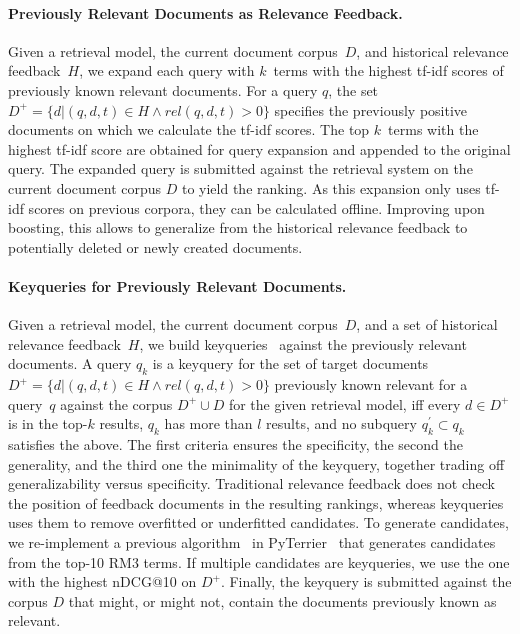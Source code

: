 \paragraph{Previously Relevant Documents as Relevance Feedback.} Given a retrieval model, the current document corpus~$D$, and historical relevance feedback~$H$, we expand each query with $k$~terms with the highest tf-idf scores of previously known relevant documents. For a query $q$, the set $D^{+} = \{d| (q,d,t) \in H \wedge rel(q,d,t) > 0\}$ specifies the previously positive documents on which we calculate the tf-idf scores. The top $k$~terms with the highest tf-idf score are obtained for query expansion and appended to the original query. The expanded query is submitted against the retrieval system on the current document corpus $D$ to yield the ranking. As this expansion only uses tf-idf scores on  previous corpora, they can be calculated offline. Improving upon boosting, this allows to generalize from the historical relevance feedback to potentially deleted or newly created documents.


\paragraph{Keyqueries for Previously Relevant Documents.} Given a retrieval model, the current document corpus~$D$, and a set of historical relevance feedback~$H$, we build keyqueries~\cite{froebe:2021c,gollub:2013a,hagen:2016b} against the previously relevant documents. A query $q_{k}$ is a keyquery for the set of target documents $D^{+} = \{d| (q,d,t) \in H \wedge rel(q,d,t) > 0\}$ previously known relevant for a query~$q$ against the corpus $D^{+} \cup D$ for the given retrieval model, iff \Ni every $d \in D^{+}$ is in the top-$k$ results, \Nii $q_{k}$ has more than $l$ results, and \Niii no subquery $q^{'}_{k} \subset q_{k}$ satisfies the above. The first criteria ensures the specificity, the second the generality, and the third one the minimality of the keyquery, together trading off generalizability versus specificity. Traditional relevance feedback does not check the position of feedback documents in the resulting rankings, whereas keyqueries uses them to remove overfitted or underfitted candidates. To generate candidates, we re-implement a previous algorithm~\cite{froebe:2022c} in PyTerrier~\cite{macdonald:2020} that generates candidates from the top-10 RM3 terms. If multiple candidates are keyqueries, we use the one with the highest nDCG@10 on $D^{+}$. Finally, the keyquery is submitted against the corpus $D$ that might, or might not, contain the documents previously known as relevant.

